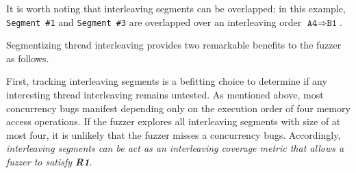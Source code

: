 

%
It is worth noting that interleaving segments can be overlapped; in
this example, \texttt{Segment \#1} and \texttt{Segment \#3} are
overlapped over an interleaving order
$\texttt{A4} \Rightarrow \texttt{B1}$.




%
Segmentizing thread interleaving provides two remarkable benefits to
the fuzzer as follows.



First, tracking interleaving segments is a befitting choice to
determine if any interesting thread interleaving remains untested.
%
As mentioned above, most concurrency bugs manifest depending only on
the execution order of four memory access operations. If the fuzzer
explores all interleaving segments with size of at most four, it is
unlikely that the fuzzer misses a concurrency bugs.
%
Accordingly, \textit{interleaving segments can be act as an
  interleaving coverage metric that allows a fuzzer to satisfy
  \textbf{R1}}.
  





